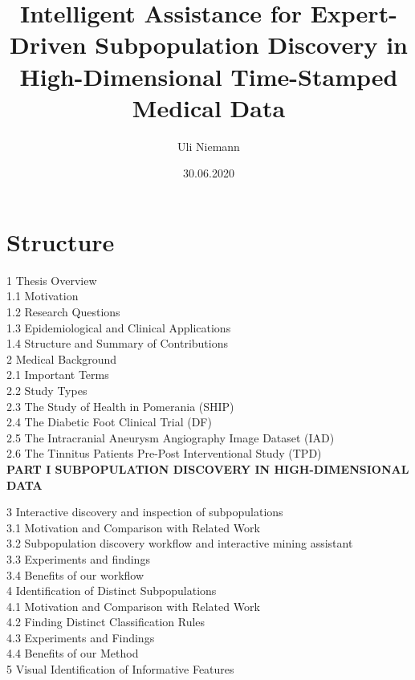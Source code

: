 \documentclass[
]{book}
\title{Intelligent Assistance for Expert-Driven Subpopulation Discovery in High-Dimensional Time-Stamped Medical Data}
\author{Uli Niemann}
\date{30.06.2020}
\begin{document}
\maketitle

{
\setcounter{tocdepth}{1}
\tableofcontents
}
\hypertarget{structure}{%
\section*{Structure}\label{structure}}

1 Thesis Overview\\
1.1 Motivation\\
1.2 Research Questions\\
1.3 Epidemiological and Clinical Applications\\
1.4 Structure and Summary of Contributions\\

2 Medical Background\\
2.1 Important Terms\\
2.2 Study Types\\
2.3 The Study of Health in Pomerania (SHIP)\\
2.4 The Diabetic Foot Clinical Trial (DF)\\
2.5 The Intracranial Aneurysm Angiography Image Dataset (IAD)\\
2.6 The Tinnitus Patients Pre-Post Interventional Study (TPD)\\

\textbf{PART I SUBPOPULATION DISCOVERY IN HIGH-DIMENSIONAL DATA}

3 Interactive discovery and inspection of subpopulations\\
3.1 Motivation and Comparison with Related Work\\
3.2 Subpopulation discovery workflow and interactive mining assistant\\
3.3 Experiments and findings\\
3.4 Benefits of our workflow\\

4 Identification of Distinct Subpopulations\\
4.1 Motivation and Comparison with Related Work\\
4.2 Finding Distinct Classification Rules\\
4.3 Experiments and Findings\\
4.4 Benefits of our Method\\

5 Visual Identification of Informative Features\\
\end{document}
